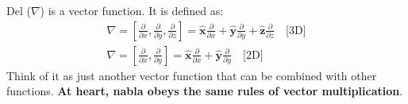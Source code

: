 Del (\( \nabla \)) is a vector function. It is defined as:
\begin{align*}
  \nabla = \left[\frac{\partial}{\partial x}, \frac{\partial}{\partial y}, \frac{\partial}{\partial z}\right] = \hat{\mathbf{x}} \frac{\partial}{\partial x} + \hat{\mathbf{y}} \frac{\partial}{\partial y} + \hat{\mathbf{z}} \frac{\partial}{\partial z} \hspace{1em} \text{[3D]} \\
  \nabla = \left[\frac{\partial}{\partial x}, \frac{\partial}{\partial y}\right] = \hat{\mathbf{x}} \frac{\partial}{\partial x} + \hat{\mathbf{y}} \frac{\partial}{\partial y} \hspace{1em} \text{[2D]}
\end{align*}
Think of it as just another vector function that can be combined with other
functions. \textbf{At heart, nabla obeys the same rules of vector
multiplication}.
